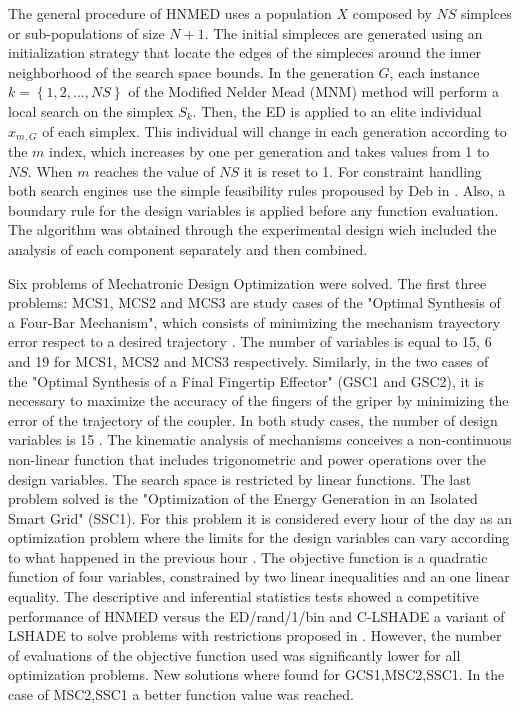 \documentclass[a4paper,12pt]{article}
\begin{document}
The general procedure of HNMED uses a population  $ X $ composed by $ NS $ simplces or sub-populations of size $ N + 1 $. The initial simpleces are generated using an initialization strategy that locate the edges of the simpleces around the inner neighborhood of the search space bounds. In the generation $ G $, each instance $ k = \left \lbrace 1,2, ..., NS \right \rbrace $ of the Modified Nelder Mead (MNM) method will perform a local search on the simplex $ S_k $. Then, the ED is applied to an  elite individual $ x_ {m, G} $ of each simplex. This individual will change in each generation according to the $m$ index, which increases by one per generation and takes values from 1 to $NS$. When $ m $ reaches the value of $ NS $ it is reset to 1. For constraint handling both search engines use the simple feasibility rules propoused by Deb in \cite {Deb98anefficient}. Also, a boundary rule for the design variables is applied before any function evaluation.  The algorithm was obtained through the experimental design wich included the analysis of each component separately and then combined.

Six problems of Mechatronic Design Optimization were solved. The first three problems: MCS1, MCS2 and MCS3 are study cases of the "Optimal Synthesis of a Four-Bar Mechanism", which consists of minimizing the mechanism trayectory error respect to a desired trajectory \cite{VegaMEC1} \cite{Portilla_Mezura_MEC3}. The number of variables is equal to 15, 6 and 19 for  MCS1, MCS2 and MCS3 respectively. Similarly, in the two cases of the "Optimal Synthesis of a Final Fingertip Effector" (GSC1 and GSC2), it is necessary to maximize the accuracy of the fingers of the griper by minimizing the error of the trajectory of the coupler. In both study cases, the number of design variables is 15 \cite{mezura-montes_dynamic_2015}. The kinematic analysis of mechanisms conceives a non-continuous non-linear function that includes trigonometric and power operations over the design variables. The search space is restricted by linear functions. The last problem solved is the "Optimization of the Energy Generation in an Isolated Smart Grid" (SSC1). For this problem it is considered every hour of the day as an optimization problem where the limits for the design variables can vary according to what happened in the previous hour \cite{tazvinga2013minimum} \cite{Ramabhotla_Economic_dispatch} \cite{zapata_zapata_control_2017}. The objective function is a quadratic function of four variables, constrained by two linear inequalities and an one linear equality.
The descriptive and inferential statistics tests showed a competitive performance of HNMED versus the ED/rand/1/bin and C-LSHADE a variant of LSHADE to solve problems with restrictions proposed in \cite{ZapataZapata2017EvolucinDC}. However, the number of evaluations of the objective function used was significantly lower for all optimization problems. New solutions where found for GCS1,MSC2,SSC1. In the case of MSC2,SSC1 a better function value was reached.
 
\end{document}
